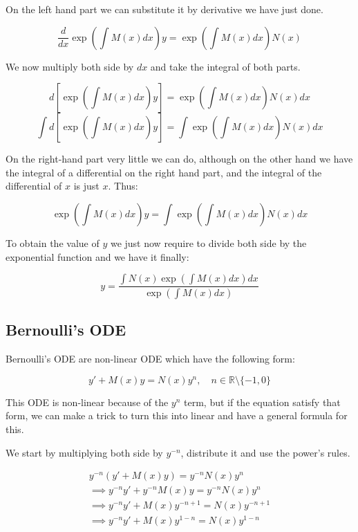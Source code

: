 \documentclass[12pt]{article}
\begin{document}
	On the left hand part we can substitute it by derivative we have just done.
	
	\[
		\frac{d}{dx} \exp\left(\int M(x) dx\right) y
		= \exp\left( \int M(x) dx \right) N(x)
	\]
	
	We now multiply both side by $dx$ and take the integral of both parts.
	
	\[
		d\left[ \exp\left(\int M(x) dx\right) y \right]
		= \exp\left( \int M(x) dx \right) N(x) dx
	\]
	\[
		\int d\left[ \exp\left(\int M(x) dx\right) y \right]
		= \int \exp\left( \int M(x) dx \right) N(x) dx
	\]
	
	On the right-hand part very little we can do, although on the other hand we have the integral of a differential on the right hand part, and the integral of the differential of $x$ is just $x$. Thus:
	
	\[
		\exp\left(\int M(x) dx\right) y
		= \int \exp\left( \int M(x) dx \right) N(x) dx
	\]
	
	To obtain the value of $y$ we just now require to divide both side by the exponential function and we have it finally:
	
	\[
		y = \frac{\int N(x) \exp\left( \int M(x) dx \right) dx}{\exp\left(\int M(x) dx\right)}
	\]
	
	\subsection{Bernoulli's ODE}
	
	Bernoulli's ODE are non-linear ODE which have the following form:
	
	\[
		y' + M(x)y = N(x)y^n, \quad n \in \mathbb{R} \setminus \{-1, 0\}
	\]
	
	This ODE is non-linear because of the $y^n$ term, but if the equation satisfy that form, we can make a trick to turn this into linear and have a general formula for this.
	
	We start by multiplying both side by $y^{-n}$, distribute it and use the power's rules.
	
	\[
		\begin{aligned}
			y^{-n} (y' + M(x)y) = y^{-n} N(x) y^n
			\\
			\implies y^{-n} y' + y^{-n} M(x) y = y^{-n} N(x) y^n
			\\
			\implies y^{-n} y' + M(x) y^{-n + 1} = N(x) y^{-n + 1}
			\\
			\implies y^{-n} y' + M(x) y^{1 - n} = N(x) y^{1 - n}
		\end{aligned}
	\]
	
\end{document}
